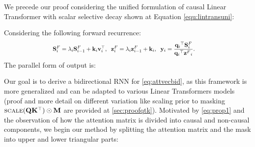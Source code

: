 We precede our proof considering the unified formulation of causal Linear Transformer with scalar selective decay shown at Equation \eqref{equ:lintransuni}:
\begin{proposition}
\label{prop:ssd}
Considering the following forward recurrence:
\hspace{-5mm}
 \begin{align}
    \label{eq:recrec}
    \hspace{-4mm}\scalemath{0.85}{{\mathbf{S}}_i^F = \textcolor{black}{{\lambda_i}} {\mathbf{S}}_{i-1}^F + \mathbf{k}_i \mathbf{v}_i^{\top}, \hspace{2mm}
   {\mathbf{z}}_i^F = \textcolor{black}{{\lambda_i}} {\mathbf{z}}_{i-1}^F + {\mathbf{k}_i}, \hspace{1mm}
    \hspace{1mm} \mathbf{y}_i= \frac{{{\mathbf{q}_i}}^{\top} {\mathbf{S}}_i^F}{{{\mathbf{q}_i}}^{\top} {\mathbf{z}^F}_i}.}
\end{align}
The parallel form of output is:

\vspace{-4mm}
\end{proposition}

Our goal is to derive a bidirectional RNN for \cref{eq:attvecbid}, as this framework is more generalized and can be adapted to various Linear Transformers models (proof and more detail on different variation like scaling prior to masking $\textsc{scale}(\mathbf{Q}\mathbf{K}^\top) \odot \mathbf{M}$ are provided at \cref{sec:proofqtk}). Motivated by \cref{eq:prop1} and the observation of how the attention matrix is divided into causal and non-causal components, we begin our method by splitting the attention matrix and the mask into upper and lower triangular parts:

\vspace{-5mm}

